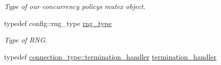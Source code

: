 \begin{DoxyCompactItemize}
\begin{DoxyCompactList}\small\item\em Type of our concurrency policy\textquotesingle{}s mutex object. \end{DoxyCompactList}\item 
typedef config\+::rng\+\_\+type \hyperlink{classwebsocketpp_1_1endpoint_adbb0a9eea3ebbf5139966858bd0fa16d}{rng\+\_\+type}
\begin{DoxyCompactList}\small\item\em Type of R\+N\+G. \end{DoxyCompactList}\item 
typedef \hyperlink{classwebsocketpp_1_1connection_a8da9613d1f13c9f4571ffb0810d43e63}{connection\+\_\+type\+::termination\+\_\+handler} \hyperlink{classwebsocketpp_1_1endpoint_a24710dbab3b51673b5459b7b609d5d66}{termination\+\_\+handler}
\end{DoxyCompactItemize}
